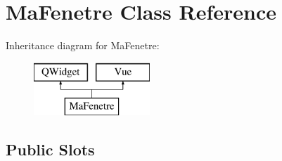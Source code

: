 \section{Ma\-Fenetre Class Reference}
\label{class_ma_fenetre}
Inheritance diagram for Ma\-Fenetre\-:\begin{figure}[H]
\begin{center}
\leavevmode
\includegraphics[height=2.000000cm]{class_ma_fenetre}
\end{center}
\end{figure}
\subsection*{Public Slots}

